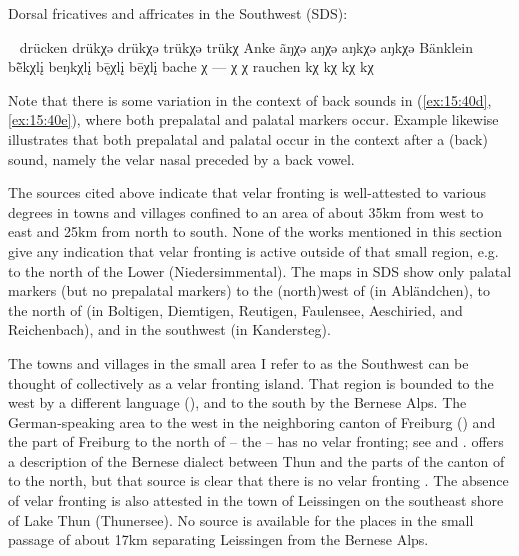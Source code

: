 \ea%
\label{ex:15:40}Dorsal fricatives and affricates in the Southwest  (SDS):
\begin{xlist}
\sn[] \tab ~ \tab {} \tab {} \tab {} \tab {}
\ex\label{ex:15:40a} drücken \tab drükχ{\textquotesingle}ə \tab drükχə \tab trükχ{\textquotesingle}ə  \tab  trükχ{\textquotesingle}
\ex\label{ex:15:40b} Anke \tab ãŋχ{\textquotesingle}ə \tab aŋχ{\textquotesingle}ə \tab aŋkχə  \tab  aŋkχ{\textquotesingle}ə
\ex\label{ex:15:40c} Bänklein \tab b\~{ē}kχ{\textquotesingle}lį \tab beŋkχ{\textquotesingle}lį \tab b\={ę}χ{\textquotesingle}lį  \tab  bēχ{\textquotesingle}lį
\ex\label{ex:15:40d} bache \tab χ{\textquotesingle}  \tab  --- \tab χ{\textquotesingle}    \tab χ{\textquotesingle}
\ex\label{ex:15:40e} rauchen \tab kχ{\textquotesingle}  \tab  kχ  \tab  kχ    \tab kχ
\end{xlist}
\z 

Note that there is some variation in the context of back sounds in (\ref{ex:15:40d}, \ref{ex:15:40e}), where both prepalatal and palatal markers occur. Example  likewise illustrates that both prepalatal and palatal occur in the context after a (back) sound, namely the velar nasal preceded by a back vowel.

The sources cited above indicate that velar fronting is well-attested to various degrees in towns and villages confined to an area of about 35km from west to east and 25km from north to south. None of the works mentioned in this section give any indication that velar fronting is active outside of that small region, e.g. to the north of the Lower  (Niedersimmental). The maps in SDS show only palatal markers (but no prepalatal markers) to the (north)west of  (in Abländchen), to the north of  (in Boltigen, Diemtigen, Reutigen, Faulensee, Aeschiried, and Reichenbach), and in the southwest (in Kandersteg).

The towns and villages in the small area I refer to as the Southwest  can be thought of collectively as a velar fronting island. That region is bounded to the west by a different language (), and to the south by the Bernese Alps. The German-speaking area to the west in the neighboring canton of Freiburg () and the part of Freiburg to the north of  -- the  -- has no velar fronting; see \citet{Stucki1917} and \citet[20]{Henzen1927}. \citet{Marti1985} offers a description of the Bernese dialect between Thun and the parts of the canton of  to the north, but that source is clear that there is no velar fronting \citep[21]{Marti1985}. The absence of velar fronting is also attested in the town of Leissingen \citep{Gröger1914c} on the southeast shore of Lake Thun (Thunersee). No source is available for the places in the small passage of about 17km separating Leissingen from the Bernese Alps.

